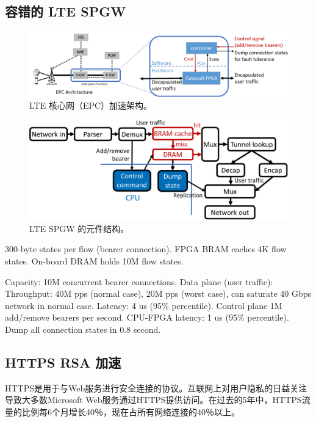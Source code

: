 \iffalse
\subsection{容错的 LTE SPGW}


\begin{figure}[htbp]
	\centering
	\includegraphics[width=1.0\textwidth]{image/EPC_arch}
	\caption{LTE 核心网（EPC）加速架构。}
	\label{clicknp:fig:epc-arch}
\end{figure}


\begin{figure}[htbp]
	\centering
	\includegraphics[width=1.0\textwidth]{image/EPC_element}
	\caption{LTE SPGW 的元件结构。}
	\label{clicknp:fig:epc-element}
\end{figure}

300-byte states per flow (bearer connection).
FPGA BRAM caches 4K flow states.
On-board DRAM holds 10M flow states.

Capacity:
10M concurrent bearer connections.
Data plane (user traffic):
Throughput: 40M pps (normal case), 20M pps (worst case), can saturate 40 Gbps network in normal case.
Latency: 4 us (95\% percentile).
Control plane
1M add/remove bearers per second.
CPU-FPGA latency: 1 us (95\% percentile).
Dump all connection states in 0.8 second.

\subsection{HTTPS RSA 加速}

HTTPS是用于与Web服务进行安全连接的协议。互联网上对用户隐私的日益关注导致大多数Microsoft Web服务通过HTTPS提供访问。在过去的5年中，HTTPS流量的比例每6个月增长40％，现在占所有网络连接的40％以上。

